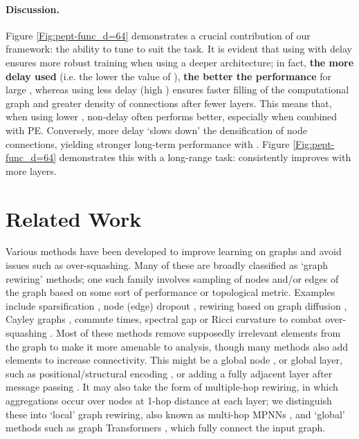 \documentclass{article}
\theoremstyle{plain}
\theoremstyle{definition}
\theoremstyle{remark}
\begin{document}
\paragraph{Discussion.} Figure \ref{Fig:pept-func_d=64} demonstrates a crucial contribution of our framework: the ability to tune  to suit the task.
 It is evident that using  with delay ensures more robust training when using a deeper architecture; in fact, \textbf{the more delay used} (i.e. the lower the value of ), \textbf{the better the performance} for large , whereas using less delay (high ) ensures faster filling of the computational graph and greater density of connections after fewer layers. This means that, when using lower , non-delay  often performs better, especially when combined with PE.
 Conversely, more delay `slows down' the
 densification of node connections, yielding stronger long-term performance with .
 Figure \ref{Fig:pept-func_d=64} demonstrates this with a long-range task:
  consistently improves with more layers.


\section{Related Work}
Various methods have been developed to improve learning on graphs and avoid issues such as over-squashing. Many of these are broadly classified as `graph rewiring' methods; one such family involves sampling of nodes and/or edges of the graph based on some sort of performance or topological metric. Examples include sparsification \cite{hamilton2017inductive}, node (edge) dropout \cite{rong2019dropedge, papp2021dropgnn}, rewiring based on graph diffusion \cite{klicpera2019diffusion}, Cayley graphs \cite{deac2022expander}, commute times, spectral gap or Ricci curvature to combat over-squashing \citep{arnaiz2022diffwire, topping2021understanding, black2023understanding}.
Most of these methods remove supposedly irrelevant elements from the graph to make it more amenable to analysis, though many methods also add elements to increase connectivity. This might be a global node \cite{battaglia2016interaction, gilmer2017neural}, or global layer, such as positional/structural encoding \cite{dwivedi2020benchmarking, dwivedi2021graph, rampavsek2022recipe, wang2022equivariant}, or adding a fully adjacent layer after message passing \cite{alon2020bottleneck}. It may also take the form of multiple-hop rewiring, in which aggregations occur over nodes at 1-hop distance at each layer; we distinguish these into `local' graph rewiring, also known as multi-hop MPNNs \cite{abboud2022shortest, abu2019mixhop, abu2020n, nikolentzos2020k, zhang2021nested}, and `global' methods such as graph Transformers \cite{dwivedi2022long, kreuzer2021rethinking, rampavsek2022recipe, ying2021transformers, yun2019graph}, which fully connect the input graph. 
\end{document}
